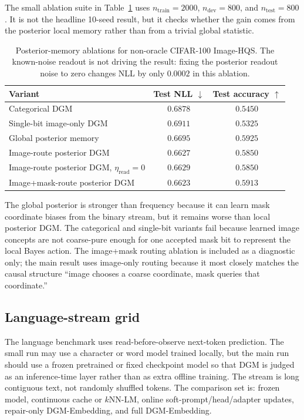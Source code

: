 The small ablation suite in Table~\ref{tab:image-hqs-ablation} uses
$n_{\mathrm{train}}=2000$, $n_{\mathrm{dev}}=800$, and $n_{\mathrm{test}}=800$.
It is not the headline 10-seed result, but it checks whether the gain comes from
the posterior local memory rather than from a trivial global statistic.

\begin{table}[h]
\centering
\small
\begin{tabular}{lcc}
\toprule
Variant & Test NLL $\downarrow$ & Test accuracy $\uparrow$ \\
\midrule
Categorical DGM & $0.6878$ & $0.5450$ \\
Single-bit image-only DGM & $0.6911$ & $0.5325$ \\
Global posterior memory & $0.6695$ & $0.5925$ \\
Image-route posterior DGM & $0.6627$ & $0.5850$ \\
Image-route posterior DGM, $\eta_{\mathrm{read}}=0$ & $0.6629$ & $0.5850$ \\
Image+mask-route posterior DGM & $0.6623$ & $0.5913$ \\
\bottomrule
\end{tabular}
\caption{Posterior-memory ablations for non-oracle CIFAR-100 Image-HQS. The
known-noise readout is not driving the result: fixing the posterior readout
noise to zero changes NLL by only $0.0002$ in this ablation.}
\label{tab:image-hqs-ablation}
\end{table}

The global posterior is stronger than frequency because it can learn mask
coordinate biases from the binary stream, but it remains worse than local
posterior DGM. The categorical and single-bit variants fail because learned
image concepts are not coarse-pure enough for one accepted mask bit to represent
the local Bayes action. The image+mask routing ablation is included as a
diagnostic only; the main result uses image-only routing because it most closely
matches the causal structure ``image chooses a coarse coordinate, mask queries
that coordinate.''

\subsection{Language-stream grid}

The language benchmark uses read-before-observe next-token prediction. The
small run may use a character or word model trained locally, but the main run
should use a frozen pretrained or fixed checkpoint model so that DGM is judged
as an inference-time layer rather than as extra offline training. The stream is
long contiguous text, not randomly shuffled tokens. The comparison set is:
frozen model, continuous cache or $k$NN-LM, online soft-prompt/head/adapter
updates, repair-only DGM-Embedding, and full DGM-Embedding.

